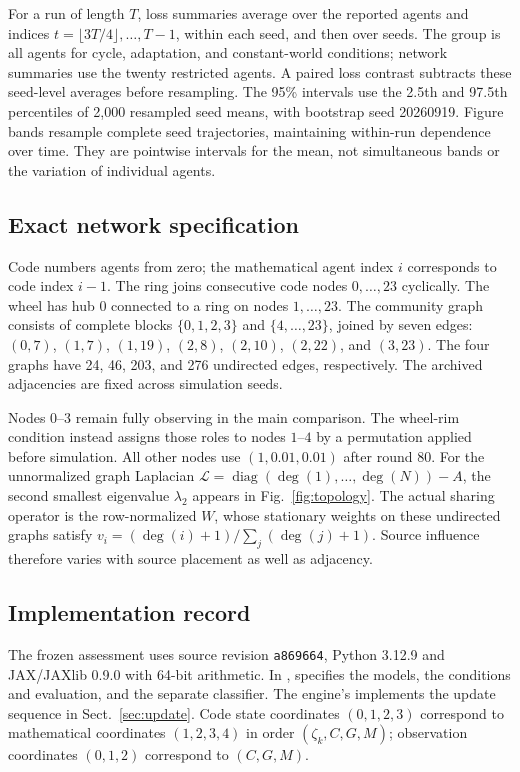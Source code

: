 \documentclass[runningheads]{llncs}
\newcommand{\diag}{\operatorname{diag}}
\begin{document}
For a run of length $T$, loss summaries average over the reported agents and
indices $t=\lfloor3T/4\rfloor,\ldots,T-1$, within each seed, and then over seeds.
The group is all agents for cycle, adaptation, and constant-world conditions;
network summaries use the twenty restricted agents. A paired loss contrast
subtracts these seed-level averages before resampling. The 95\% intervals use
the 2.5th and 97.5th percentiles of 2,000 resampled seed means, with bootstrap
seed 20260919. Figure bands resample complete seed trajectories, maintaining
within-run dependence over time. They are pointwise intervals for the mean,
not simultaneous bands or the variation of individual agents.

\subsection{Exact network specification}
\label{app:networks}
Code numbers agents from zero; the mathematical agent index $i$ corresponds to
code index $i-1$. The ring joins consecutive code nodes $0,\ldots,23$ cyclically.
The wheel has hub 0 connected to a ring on nodes $1,\ldots,23$. The community
graph consists of complete blocks $\{0,1,2,3\}$ and $\{4,\ldots,23\}$, joined by
seven edges:
$(0,7)$, $(1,7)$, $(1,19)$, $(2,8)$, $(2,10)$, $(2,22)$, and $(3,23)$.
The four graphs have 24, 46, 203, and 276 undirected edges, respectively.
The archived adjacencies are fixed across simulation seeds.

Nodes $0$--$3$ remain fully observing in the main comparison. The wheel-rim
condition instead assigns those roles to nodes $1$--$4$ by a permutation applied
before simulation. All other nodes use $(1,0.01,0.01)$ after round 80.
For the unnormalized graph Laplacian
$\mathscr L=\diag(\deg(1),\ldots,\deg(N))-A$, the second smallest eigenvalue
$\lambda_2$ appears in Fig.~\ref{fig:topology}. The actual sharing operator is the
row-normalized $W$, whose stationary weights on these undirected graphs satisfy
$v_i=(\deg(i)+1)/\sum_j(\deg(j)+1)$. Source influence therefore varies with
source placement as well as adjacency.

\subsection{Implementation record}
The frozen assessment  uses source revision
\texttt{a869664}, Python 3.12.9 and JAX/JAXlib 0.9.0 with 64-bit arithmetic.
In ,  specifies the models,
 the conditions and evaluation, and 
the separate classifier. The engine's  implements the update
sequence in Sect.~\ref{sec:update}.
Code state coordinates $(0,1,2,3)$ correspond to mathematical coordinates
$(1,2,3,4)$ in order $(\zeta_k,C,G,M)$; observation coordinates $(0,1,2)$
correspond to $(C,G,M)$.
\end{document}
